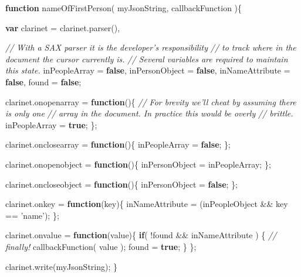 \documentclass[12pt, ]{article}
\newenvironment{Shaded}{}{}
\newcommand{\KeywordTok}[1]{\textcolor[rgb]{0.00,0.44,0.13}{\textbf{{#1}}}}
\newcommand{\StringTok}[1]{\textcolor[rgb]{0.25,0.44,0.63}{{#1}}}
\newcommand{\CommentTok}[1]{\textcolor[rgb]{0.38,0.63,0.69}{\textit{{#1}}}}
\newcommand{\OtherTok}[1]{\textcolor[rgb]{0.00,0.44,0.13}{{#1}}}
\newcommand{\FunctionTok}[1]{\textcolor[rgb]{0.02,0.16,0.49}{{#1}}}
\newcommand{\NormalTok}[1]{{#1}}
\begin{document}
\begin{Shaded}
\begin{Highlighting}[]
\KeywordTok{function} \FunctionTok{nameOfFirstPerson}\NormalTok{( myJsonString, callbackFunction )\{}


   \KeywordTok{var} \NormalTok{clarinet = }\OtherTok{clarinet}\NormalTok{.}\FunctionTok{parser}\NormalTok{(),}
   
       \CommentTok{// With a SAX parser it is the developer's responsibility }
       \CommentTok{// to track where in the document the cursor currently is.}
       \CommentTok{// Several variables are required to maintain this state.        }
       \NormalTok{inPeopleArray = }\KeywordTok{false}\NormalTok{,   }
       \NormalTok{inPersonObject = }\KeywordTok{false}\NormalTok{,}
       \NormalTok{inNameAttribute = }\KeywordTok{false}\NormalTok{,}
       \NormalTok{found = }\KeywordTok{false}\NormalTok{;}
   
   \OtherTok{clarinet}\NormalTok{.}\FunctionTok{onopenarray} \NormalTok{= }\KeywordTok{function}\NormalTok{()\{}
      \CommentTok{// For brevity we'll cheat by assuming there is only one}
      \CommentTok{// array in the document. In practice this would be overly}
      \CommentTok{// brittle.      }
      \NormalTok{inPeopleArray = }\KeywordTok{true}\NormalTok{; }
   \NormalTok{\};}
   
   \OtherTok{clarinet}\NormalTok{.}\FunctionTok{onclosearray} \NormalTok{= }\KeywordTok{function}\NormalTok{()\{}
      \NormalTok{inPeopleArray = }\KeywordTok{false}\NormalTok{;}
   \NormalTok{\};   }
   
   \OtherTok{clarinet}\NormalTok{.}\FunctionTok{onopenobject} \NormalTok{= }\KeywordTok{function}\NormalTok{()\{}
      \NormalTok{inPersonObject = inPeopleArray; }
   \NormalTok{\};}
   
   \OtherTok{clarinet}\NormalTok{.}\FunctionTok{oncloseobject} \NormalTok{= }\KeywordTok{function}\NormalTok{()\{}
      \NormalTok{inPersonObject = }\KeywordTok{false}\NormalTok{;}
   \NormalTok{\};   }
      
   \OtherTok{clarinet}\NormalTok{.}\FunctionTok{onkey} \NormalTok{= }\KeywordTok{function}\NormalTok{(key)\{}
      \NormalTok{inNameAttribute = (inPeopleObject && key == }\StringTok{'name'}\NormalTok{);}
   \NormalTok{\};}

   \OtherTok{clarinet}\NormalTok{.}\FunctionTok{onvalue} \NormalTok{= }\KeywordTok{function}\NormalTok{(value)\{}
      \KeywordTok{if}\NormalTok{( !found && inNameAttribute ) \{}
         \CommentTok{// finally!}
         \FunctionTok{callbackFunction}\NormalTok{( value );}
         \NormalTok{found = }\KeywordTok{true}\NormalTok{;}
      \NormalTok{\}}
   \NormalTok{\};      }
   
   \OtherTok{clarinet}\NormalTok{.}\FunctionTok{write}\NormalTok{(myJsonString);   }
\NormalTok{\}}
\end{Highlighting}
\end{Shaded}
\end{document}
